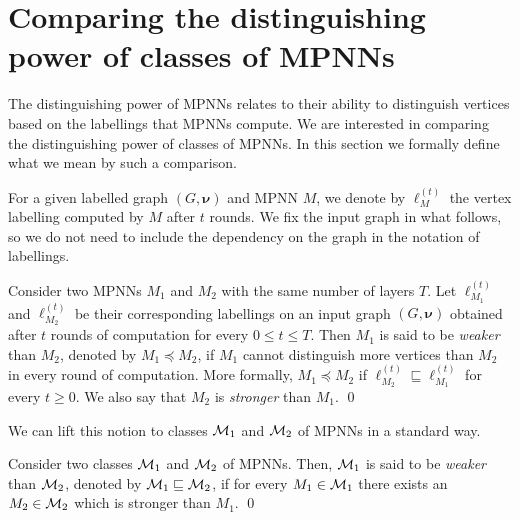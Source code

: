 \section{Comparing the distinguishing power of classes of MPNNs}\label{subsec:compare}
The distinguishing power of MPNNs relates to their ability to distinguish vertices based on the labellings that MPNNs compute. We are interested in comparing the distinguishing power of classes of MPNNs. In this section we formally define what we
mean by such a comparison.

For a given labelled graph $( G,\pmb{\nu})$ and MPNN $M$, we denote by 
$\pmb{\ell}_M^{(t)}$ the vertex labelling computed by $M$ after $t$ rounds. We fix the input graph in what follows, so we do not need to include the dependency on the graph in the notation of labellings.

\begin{definition}\label{def:mpnnweak}\normalfont
Consider two MPNNs $M_1$ and $M_2$ with the same number of layers $T$. Let $\pmb{\ell}_{M_1}^{(t)}$ and $\pmb{\ell}_{M_2}^{(t)}$  be their corresponding labellings on an input graph $( G,\pmb{\nu})$ obtained after $t$ rounds of computation for every $0 \le t \le T$. Then
$M_1$ is said to be \textit{weaker} than $M_2$, denoted by $M_1\preceq M_2$, if $M_1$ cannot distinguish more vertices  than $M_2$ in every round of computation. More formally, $M_1\preceq M_2$ if $\pmb{\ell}_{M_2}^{(t)}\sqsubseteq
\pmb{\ell}_{M_1}^{(t)}$ for every $t\geq 0$. We also say that $M_2$ is \textit{stronger} than $M_1$. \qed
\end{definition}
We can lift this notion to classes  $\mathcal{M}_1$ and $\mathcal{M}_2$ of MPNNs in a standard way. 

\begin{definition}\label{def:classesweak}\normalfont
Consider two classes $\mathcal{M}_1$ and $\mathcal{M}_2$ of MPNNs.
Then, $\mathcal{M}_1$ is said to be \textit{weaker} than $\mathcal{M}_2$, denoted by 
$\mathcal{M}_1\sqsubseteq \mathcal{M}_2$, if for every $M_1\in \mathcal{M}_1$
there exists an $M_2\in\mathcal{M}_2$ which is stronger than $M_1$. \qed
\end{definition}

